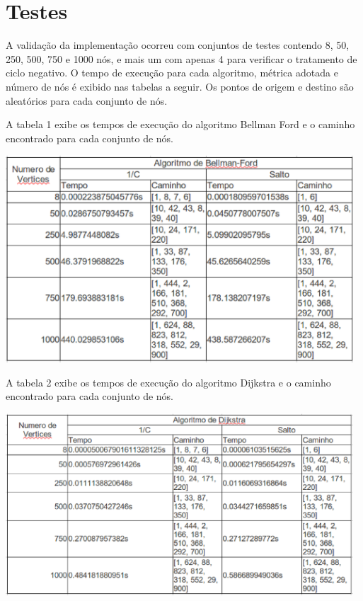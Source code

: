 \documentclass[a4paper,10pt]{article}
\begin{document}
\section{Testes}{
A validação da implementação ocorreu com conjuntos de testes contendo 8, 50, 250, 500, 750 e 1000 nós, e
mais um com apenas 4 para verificar o tratamento de ciclo negativo.
O tempo de execução para cada algoritmo, métrica adotada e número de nós é exibido nas tabelas a seguir. Os
pontos de origem e destino são aleatórios para cada conjunto de nós.

A tabela 1 exibe os tempos de execução do algoritmo Bellman Ford e o caminho encontrado para cada conjunto
de nós.

\begin{center}
\includegraphics[width=13cm]{bellman_tab.eps}

\end{center}  


A tabela 2 exibe os tempos de execução do algoritmo Dijkstra e o caminho encontrado para cada conjunto de
nós.

\begin{center}
\includegraphics[width=13cm]{dijkstra_tab.eps}

\end{center}  


}
\end{document}

